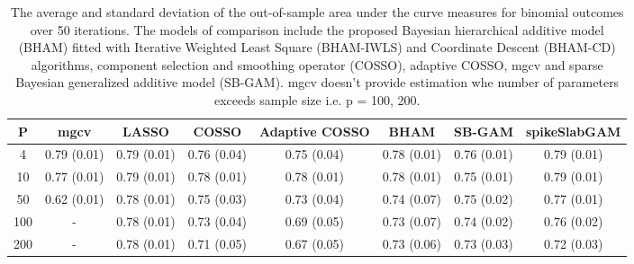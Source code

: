 \begin{table}[ht]
\centering
\begin{tabular}{cccccccc}
  \hline
P & mgcv & LASSO & COSSO & Adaptive COSSO & BHAM & SB-GAM & spikeSlabGAM \\ 
  \hline
  4 & 0.79 (0.01) & 0.79 (0.01) & 0.76 (0.04) & 0.75 (0.04) & 0.78 (0.01) & 0.76 (0.01) & 0.79 (0.01) \\ 
   10 & 0.77 (0.01) & 0.79 (0.01) & 0.78 (0.01) & 0.78 (0.01) & 0.78 (0.01) & 0.75 (0.01) & 0.79 (0.01) \\ 
   50 & 0.62 (0.01) & 0.78 (0.01) & 0.75 (0.03) & 0.73 (0.04) & 0.74 (0.07) & 0.75 (0.02) & 0.77 (0.01) \\ 
  100 & - & 0.78 (0.01) & 0.73 (0.04) & 0.69 (0.05) & 0.73 (0.07) & 0.74 (0.02) & 0.76 (0.02) \\ 
  200 & - & 0.78 (0.01) & 0.71 (0.05) & 0.67 (0.05) & 0.73 (0.06) & 0.73 (0.03) & 0.72 (0.03) \\ 
   \hline
\end{tabular}
\caption{The average and standard deviation of the out-of-sample area under the curve measures
    for binomial outcomes over 50 iterations. The models of comparison include the proposed Bayesian
    hierarchical additive model (BHAM) fitted with Iterative Weighted Least Square (BHAM-IWLS) and
    Coordinate Descent (BHAM-CD) algorithms, component selection and smoothing operator (COSSO),
    adaptive COSSO, mgcv and sparse Bayesian generalized additive model (SB-GAM). mgcv doesn't provide
    estimation whe number of parameters exceeds sample size i.e. p = 100, 200.} 
\label{tab:lnr_bin_auc}
\end{table}
